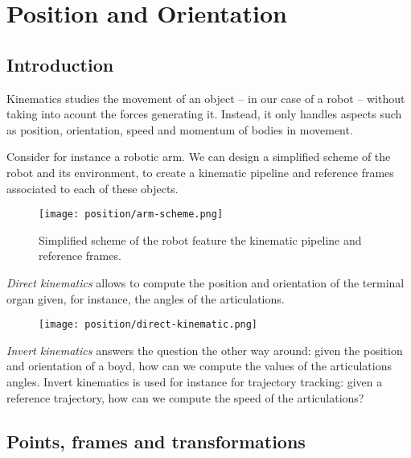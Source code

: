 \section{Position and Orientation}
\subsection{Introduction}
Kinematics studies the movement of an object -- in our case of a robot -- without taking into acount the forces generating it. Instead, it only handles aspects such as position, orientation, speed and momentum of bodies in movement.

Consider for instance a robotic arm. We can design a simplified scheme of the robot and its environment, to create a kinematic pipeline and reference frames associated to each of these objects.

\begin{figure}[H]
    \centering
    \texttt{[image: position/arm-scheme.png]}
    \caption{Simplified scheme of the robot feature the kinematic pipeline and reference frames.}
\end{figure}

\emph{Direct kinematics} allows to compute the position and orientation of the terminal organ given, for instance, the angles of the articulations.

\begin{figure}[H]
    \centering
    \texttt{[image: position/direct-kinematic.png]}
\end{figure}

\emph{Invert kinematics} answers the question the other way around: given the position and orientation of a boyd, how can we compute the values of the articulations angles. Invert kinematics is used for instance for trajectory tracking: given a reference trajectory, how can we compute the speed of the articulations?

\subsection{Points, frames and transformations}
